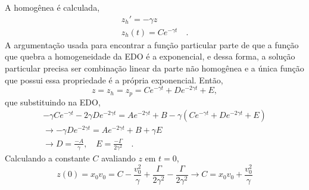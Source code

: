 \documentclass[12pt]{article}
\begin{document}
A homogênea é calculada,
\begin{equation}
\begin{split}
z_h' = -\gamma z \\
z_h(t) = Ce^{-\gamma t} \quad. 
\end{split}
\end{equation}
A argumentação usada para encontrar a função particular parte de que a função que quebra a homogeneidade da EDO é a exponencial, e dessa forma, a solução particular precisa ser combinação linear da parte não homogênea e a única função que possui essa propriedade é a própria exponencial.  Então,
\begin{equation}
z = z_h = z_p = Ce^{-\gamma t } + De^{-2\gamma t} + E, 
\end{equation}
que substituindo na EDO,
\begin{equation}
\begin{split}
-\gamma C e^{-\gamma t} -2\gamma De^{-2\gamma t} = Ae^{-2\gamma t} + B - \gamma\left(Ce^{-\gamma t } + De^{-2\gamma t} + E\right) \\
\rightarrow -\gamma De^{-2\gamma t} = Ae^{-2\gamma t} + B + \gamma E \\
\rightarrow D = \frac{-A}{\gamma}, \quad E = \frac{-\Gamma}{2\gamma^2} \quad . 
\end{split}
\end{equation}
Calculando a constante $C$ avaliando $z$ em $t=0$, 
\begin{equation}
z(0) = x_0v_0 = C - \frac{v_0^2}{\gamma} + \frac{\Gamma}{2\gamma^2} - \frac{\Gamma}{2\gamma^2} \rightarrow C = x_0v_0 + \frac{v_0^2}{\gamma}
\end{equation}
\end{document}
